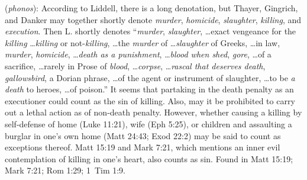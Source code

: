 \item[Killing,]

(\textit{phonos}):
According to Liddell, there is a long denotation, but Thayer, Gingrich, and Danker may together shortly denote \emph{murder}, \emph{homicide}, \emph{slaughter}, \emph{killing}, and \emph{execution}. Then L. shortly denotes ``\emph{murder}, \emph{slaughter}, \ldots exact vengeance for the \emph{killing} \ldots \emph{killing} or not-\emph{killing}, \ldots the \emph{murder} of \ldots \emph{slaughter} of Greeks, \ldots in law, \emph{murder}, \emph{homicide}, \ldots \emph{death as a punishment}, \ldots \emph{blood when shed}, \emph{gore}, \ldots of a sacrifice, \ldots rarely in Prose of \emph{blood}, \ldots \emph{corpse}, \ldots \emph{rascal that deserves death}, \emph{gallowsbird}, a Dorian phrase, \ldots of the agent or instrument of slaughter, \ldots to be \emph{a death} to heroes, \ldots of poison.'' It seems that partaking in the death penalty as an executioner could count as the sin of killing. Also, may it be prohibited to carry out a lethal action as of non-death penalty. However, whether causing a killing by self-defense of home (Luke 11:21), wife (Eph 5:25), or children and assaulting a burglar in one's own home (Matt 24:43; Exod 22:2) may be said to count as exceptions thereof. Matt 15:19 and Mark 7:21, which mentions an inner evil contemplation of killing in one's heart, also counts as sin.
Found in Matt 15:19; Mark 7:21; Rom 1:29; 1~Tim 1:9.
